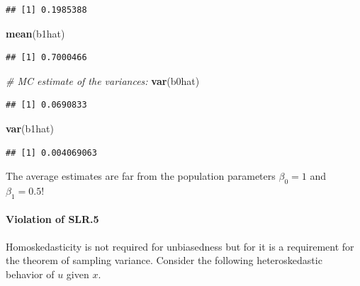 \documentclass[]{book}
\newenvironment{Shaded}{\begin{snugshade}}{\end{snugshade}}
\newcommand{\CommentTok}[1]{\textcolor[rgb]{0.56,0.35,0.01}{\textit{#1}}}
\newcommand{\KeywordTok}[1]{\textcolor[rgb]{0.13,0.29,0.53}{\textbf{#1}}}
\newcommand{\NormalTok}[1]{#1}
\let\oldparagraph\paragraph
\renewcommand{\paragraph}[1]{\oldparagraph{#1}\mbox{}}
\begin{document}
\begin{verbatim}
## [1] 0.1985388
\end{verbatim}

\begin{Shaded}
\begin{Highlighting}[]
\KeywordTok{mean}\NormalTok{(b1hat)}
\end{Highlighting}
\end{Shaded}

\begin{verbatim}
## [1] 0.7000466
\end{verbatim}

\begin{Shaded}
\begin{Highlighting}[]
\CommentTok{# MC estimate of the variances:}
\KeywordTok{var}\NormalTok{(b0hat)}
\end{Highlighting}
\end{Shaded}

\begin{verbatim}
## [1] 0.0690833
\end{verbatim}

\begin{Shaded}
\begin{Highlighting}[]
\KeywordTok{var}\NormalTok{(b1hat)}
\end{Highlighting}
\end{Shaded}

\begin{verbatim}
## [1] 0.004069063
\end{verbatim}

The average estimates are far from the population parameters
\(\beta_0=1\) and \(\beta_1 = 0.5\)!

\hypertarget{violation-of-slr.5}{%
\paragraph{Violation of SLR.5}\label{violation-of-slr.5}}

Homoskedasticity is not required for unbiasedness but for it is a
requirement for the theorem of sampling variance. Consider the following
heteroskedastic behavior of \(u\) given \(x\).
\end{document}

